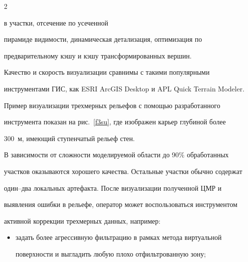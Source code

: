    \begin{multicols}{2}



\noindent

 в участки, отсечение по усеченной 

пирамиде видимости, динамическая детализация, оптимизация по 

предварительному кэшу и кэшу трансформированных вершин.

  

   

   Качество и скорость визуализации сравнимы с такими популярными 

инструментами ГИС, как ESRI ArcGIS Desktop и APL Quick Terrain Modeler. 

Пример визуализации трехмерных рельефов с помощью разработанного 

инструмента показан на рис.~\ref{f3su}, где изображен карьер глубиной более 

300~м, имеющий ступенчатый рельеф стен.

 

   В зависимости от сложности моделируемой области до 90\% обработанных 

участков оказываются хорошего качества. Остальные участки обычно содержат 

один--два локальных артефакта. После визуализации полученной ЦМР и 

выявления ошибки в рельефе, оператор может воспользоваться инструментом 

активной коррекции трехмерных данных, например:

   \begin{itemize}

\item задать более агрессивную фильтрацию в рамках метода виртуальной 

поверхности и выгладить любую плохо отфильтрованную зону;

\end{itemize}




\end{multicols}



